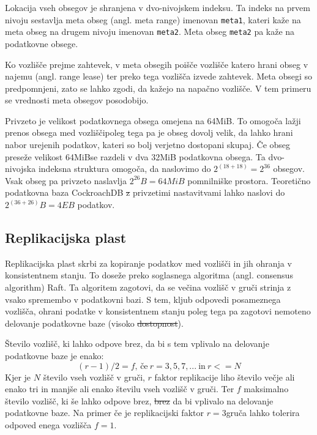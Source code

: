 \documentclass[a4paper, 12pt]{book}
\providecommand{\DIFaddtex}[1]{{\protect\color{blue}\uwave{#1}}} %
\providecommand{\DIFdeltex}[1]{{\protect\color{red}\sout{#1}}}                      %
\providecommand{\DIFaddbegin}{} %
\providecommand{\DIFaddend}{} %
\providecommand{\DIFdelbegin}{} %
\providecommand{\DIFdelend}{} %
\providecommand{\DIFadd}[1]{\texorpdfstring{\DIFaddtex{#1}}{#1}} %
\providecommand{\DIFdel}[1]{\texorpdfstring{\DIFdeltex{#1}}{}} %
\newcommand{\DIFscaledelfig}{0.5}
\newlength{\DIFdelgraphicswidth} %
\newlength{\DIFdelgraphicsheight} %
\newcommand{\DIFaddincludegraphics}[2][]{{\color{blue}\fbox{\DIFOincludegraphics[#1]{#2}}}} %
\newcommand{\DIFdelincludegraphics}[2][]{%
\sbox{\DIFdelgraphicsbox}{\DIFOincludegraphics[#1]{#2}}%
\settoboxwidth{\DIFdelgraphicswidth}{\DIFdelgraphicsbox} %
\settoboxtotalheight{\DIFdelgraphicsheight}{\DIFdelgraphicsbox} %
\scalebox{\DIFscaledelfig}{%
\parbox[b]{\DIFdelgraphicswidth}{\usebox{\DIFdelgraphicsbox}\\[-\baselineskip] \rule{\DIFdelgraphicswidth}{0em}}\llap{\resizebox{\DIFdelgraphicswidth}{\DIFdelgraphicsheight}{%
\setlength{\unitlength}{\DIFdelgraphicswidth}%
\begin{picture}(1,1)%
\thicklines\linethickness{2pt} %
{\color[rgb]{1,0,0}\put(0,0){\framebox(1,1){}}}%
{\color[rgb]{1,0,0}\put(0,0){\line( 1,1){1}}}%
{\color[rgb]{1,0,0}\put(0,1){\line(1,-1){1}}}%
\end{picture}%
}\hspace*{3pt}}} %
} %
\DeclareRobustCommand{\DIFaddbegin}{\DIFOaddbegin \let\includegraphics\DIFaddincludegraphics} %
\DeclareRobustCommand{\DIFaddend}{\DIFOaddend \let\includegraphics\DIFOincludegraphics} %
\DeclareRobustCommand{\DIFdelbegin}{\DIFOdelbegin \let\includegraphics\DIFdelincludegraphics} %
\DeclareRobustCommand{\DIFdelend}{\DIFOaddend \let\includegraphics\DIFOincludegraphics} %
\begin{document}
Lokacija vseh obsegov je shranjena v dvo-nivojskem indeksu. Ta indeks na prvem nivoju sestavlja meta obseg (angl. meta range) imenovan \texttt{meta1}, kateri kaže na meta obseg na drugem nivoju imenovan \texttt{meta2}. Meta obseg \texttt{meta2} pa kaže na podatkovne obsege.

Ko vozlišče prejme zahtevek, v meta obsegih poišče vozlišče katero hrani obseg v najemu (angl. range lease) ter preko tega vozlišča izvede zahtevek. Meta obsegi so predpomnjeni, zato se lahko zgodi, da kažejo na napačno vozlišče. V tem primeru se vrednosti meta obsegov posodobijo.

Privzeto je velikost podatkovnega obsega omejena na 64MiB. To omogoča lažji prenos obsega med vozlišči\DIFaddbegin \DIFadd{, }\DIFaddend poleg tega pa je obseg dovolj velik, da lahko hrani nabor urejenih podatkov, kateri so bolj verjetno dostopani skupaj. Če obseg preseže velikost 64MiB\DIFaddbegin \DIFadd{, }\DIFaddend se razdeli v dva 32MiB podatkovna obsega. Ta dvo-nivojska indeksna struktura omogoča, da naslovimo do \(2^{(18 + 18)} = 2^{36}\) obsegov. Vsak obseg pa privzeto naslavlja \(2^{26}B = 64MiB\) pomnilniške prostora. Teoretično podatkovna baza CockroachDB \DIFdelbegin \DIFdel{z }\DIFdelend \DIFaddbegin \DIFadd{s }\DIFaddend privzetimi nastavitvami lahko naslovi do \(2^{(36+26)}B = 4EB\) podatkov. 

\subsection{Replikacijska plast}

Replikacijska plast skrbi za kopiranje podatkov med vozlišči in jih ohranja v konsistentnem stanju. To doseže preko soglasnega algoritma (angl. consensus algorithm) Raft. Ta algoritem zagotovi, da se večina vozlišč v gruči strinja z vsako spremembo v podatkovni bazi. S tem, kljub odpovedi posameznega vozlišča, ohrani podatke v konsistentnem stanju poleg tega pa zagotovi nemoteno delovanje podatkovne baze (visoko \DIFdelbegin \DIFdel{dostopnost}\DIFdelend \DIFaddbegin \DIFadd{razpoložljivost}\DIFaddend ).

Število vozlišč, ki lahko odpove brez, da bi s tem vplivalo na delovanje podatkovne baze je enako:
\[(r - 1)/2 = f \text{, če}\ r = 3, 5, 7, ...\ \text{in}\ r <= N\]
Kjer je \(N\) število vseh vozlišč v gruči, \(r\) faktor replikacije liho število večje ali enako tri in manjše ali enako številu vseh vozlišč v gruči. Ter \(f\) maksimalno število vozlišč, ki še lahko odpove brez, \DIFdelbegin \DIFdel{brez }\DIFdelend da bi vplivalo na delovanje podatkovne baze. Na primer če je replikacijski faktor \(r = 3\)\DIFaddbegin \DIFadd{, }\DIFaddend gruča lahko tolerira odpoved enega vozlišča \(f = 1\).
\end{document}
